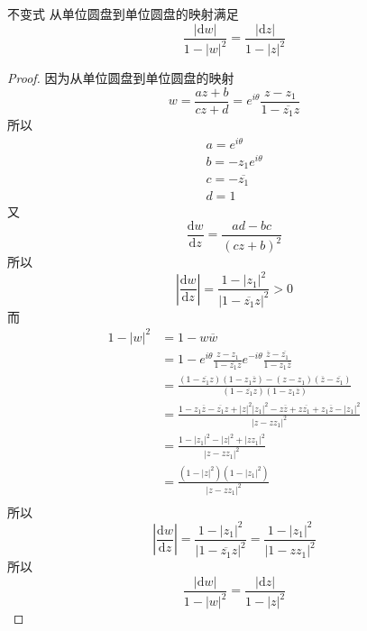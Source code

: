 \begin{corollary*}{不变式}
    从单位圆盘到单位圆盘的映射满足
    \[
    \frac{|\mathrm{d}w|}{1-|w|^2} = \frac{|\mathrm{d}z|}{1-|z|^2}
    \]
\end{corollary*}
\begin{proof}
因为从单位圆盘到单位圆盘的映射
\[
w = \frac{az+b}{cz+d} = e^{i\theta}\frac{z-z_1}{1-\overline{z_1}z}
\]
所以
\begin{gather*}
a = e^{i\theta} \\
b = -z_1e^{i\theta}\\
c = -\overline{z_1} \\
d = 1
\end{gather*}
又
\[
\frac{\mathrm{d}w}{\mathrm{d}z} = \frac{ad-bc}{(cz+b)^2}
\]
所以
\[
\left|\frac{\mathrm{d}w}{\mathrm{d}z}\right| = \frac{1-|z_1|^2}{|1-\overline{z_1}z|^2} > 0
\]
而
\[
\begin{split}
1-|w|^2 &= 1-w\overline{w}\\
&= 1 - e^{i\theta}\frac{z-z_1}{1-\overline{z_1}z}e^{-i\theta}\frac{\overline{z}-\overline{z_1}}{1-z_1\overline{z}} \\
&= \frac{(1-\overline{z_1}z)(1-z_1\overline{z}) - (z-z_1)(\overline{z}-\overline{z_1})}
{(1-\overline{z_1}z)(1-z_1\overline{z})} \\
&= \frac{1-z_1\overline{z}-\overline{z_1}z+|z|^2|z_1|^2-z\overline{z}+z\overline{z_1}+z_1\overline{z}-|z_1|^2}{|z-zz_1|^2} \\
&= \frac{1-|z_1|^2-|z|^2+|zz_1|^2}
{|z-zz_1|^2} \\
&= \frac{(1-|z|^2)(1-|z_1|^2)}
{|z-zz_1|^2}\\
\end{split}
\]
所以
\[
\left|\frac{\mathrm{d}w}{\mathrm{d}z}\right|
= \frac{1-|z_1|^2}{|1-\overline{z_1}z|^2}
 = \frac{1-|z_1|^2}{|1-zz_1|^2}
\]
所以
\[
\frac{|\mathrm{d}w|}{1-|w|^2} = \frac{|\mathrm{d}z|}{1-|z|^2}
\]
\end{proof}

